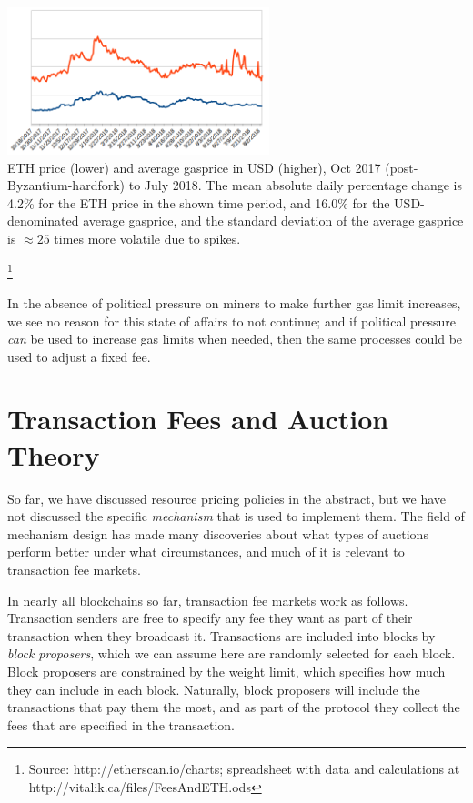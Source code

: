 \documentclass[12pt, final]{article}
\begin{document}
\begin{center}
\includegraphics[width=3in]{PriceAndFees.png} \\
\scriptsize{ETH price (lower) and average gasprice in USD (higher), Oct 2017 (post-Byzantium-hardfork) to July 2018. The mean absolute daily percentage change is 4.2\% for the ETH price in the shown time period, and 16.0\% for the USD-denominated average gasprice, and the standard deviation of the average gasprice is $\approx 25$ times more volatile due to spikes.}

\footnote{Source: http://etherscan.io/charts; spreadsheet with data and calculations at http://vitalik.ca/files/FeesAndETH.ods}
\end{center}

In the absence of political pressure on miners to make further gas limit increases, we see no reason for this state of affairs to not continue; and if political pressure \emph{can} be used to increase gas limits when needed, then the same processes could be used to adjust a fixed fee.

\section{Transaction Fees and Auction Theory}

So far, we have discussed resource pricing policies in the abstract, but we have not discussed the specific \emph{mechanism} that is used to implement them. The field of mechanism design has made many discoveries about what types of auctions perform better under what circumstances, and much of it is relevant to transaction fee markets.

In nearly all blockchains so far, transaction fee markets work as follows. Transaction senders are free to specify any fee they want as part of their transaction when they broadcast it. Transactions are included into blocks by \emph{block proposers}, which we can assume here are randomly selected for each block. Block proposers are constrained by the weight limit, which specifies how much they can include in each block. Naturally, block proposers will include the transactions that pay them the most, and as part of the protocol they collect the fees that are specified in the transaction.
\end{document}
